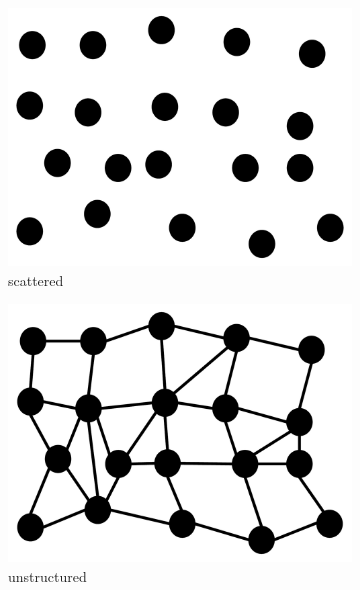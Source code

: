 \begin{figure}
  \begin{subfigure}[b]{0.19\textwidth}
    \includegraphics[clip=true, width=\textwidth]{Images/scattered.pdf}
    \caption{scattered}
    \label{fig:scattered}
  \end{subfigure}
  \begin{subfigure}[b]{0.2\textwidth}
    \includegraphics[clip=true, width=\textwidth]{Images/unstructured.pdf}
    \caption{unstructured}
    \label{fig:unstructured}
  \end{subfigure}
  \begin{subfigure}[b]{0.2\textwidth}

\end{subfigure}
\end{figure}
